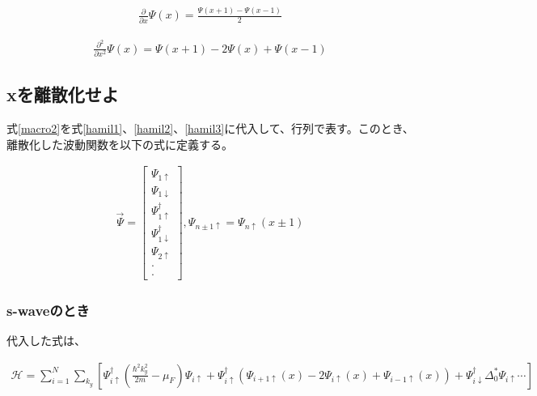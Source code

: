 \documentclass{jsarticle}
\begin{document}
            \begin{align}
                \frac{\partial}{\partial x}\Psi\left(x\right)=
                \frac{\Psi\left(x+1\right)-\Psi\left(x-1\right)}{2}
            \end{align}
    
            \begin{align}
                \frac{\partial^2}{\partial x^2}\Psi\left(x\right)=
                \Psi\left(x+1\right)-2\Psi\left(x\right)+\Psi\left(x-1\right)
                \label{macro2}
            \end{align}
    
            \subsection{xを離散化せよ}
            式\eqref{macro2}を式\eqref{hamil1}、\eqref{hamil2}、\eqref{hamil3}に代入して、行列で表す。このとき、離散化した波動関数を以下の式に定義する。
            
            \begin{align}
                \vec{\Psi}=
                \begin{bmatrix}
                    \Psi_{1\uparrow} \\
                    \Psi_{1\downarrow} \\
                    \Psi_{1\uparrow}^\dagger \\
                    \Psi_{1\downarrow}^\dagger \\
                    \Psi_{2\uparrow} \\
                    \cdot \\
                    \cdot
                \end{bmatrix},
                \Psi_{n\pm 1\uparrow}=\Psi_{n\uparrow}\left(x\pm 1\right)
            \end{align}
    
            \subsubsection{s-waveのとき}
            代入した式は、
    
            \begin{align}
                \mathcal{H}= \sum_{i=1}^N \sum_{k_y}
                \left[ \Psi^\dagger_{i\uparrow} \left( \frac{\hbar^2k_y^2}{2m}-\mu_F \right)\Psi_{i\uparrow}
                +\Psi^\dagger_{i\uparrow} \left( \Psi_{i+1\uparrow}\left(x\right)-2\Psi_{i\uparrow}\left(x\right)+\Psi_{i-1\uparrow}\left(x\right)
                \right)+\Psi^\dagger_{i\downarrow} \Delta_0^\ast \Psi_{i\uparrow} \cdots
                \right]
                \label{hamil'}
            \end{align}
    
\end{document}

